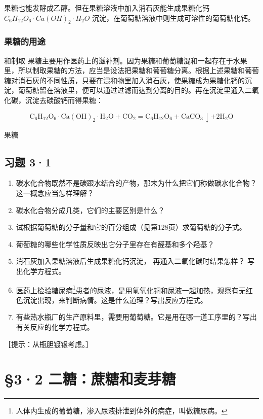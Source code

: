 果糖也能发酵成乙醇。但在果糖溶液中加入消石灰能生成果糖化钙
\(C_{6}H_{12}O_{6}\cdot Ca(OH)_{2}\cdot H_{2}O\)
沉淀，在葡萄糖溶液中则生成可溶性的葡萄糖化钙。

\subsubsection{果糖的用途}

和制取
果糖主要用作医药上的滋补剂。因为果糖和葡萄糖混和一起存在于水果里，所以制取果糖的方法，应当是设法把果糖和葡萄糖分离。根据上述果糖和葡萄糖对消石灰的不同性质，只要在混和物里加入消石灰，使果糖成为果糖化钙的沉淀，葡萄糖留在溶液里，便可以通过过滤而达到分离的目的。再在沉淀里通入二氧化碳，沉淀去碳酸钙而得果糖：

\[
\mathrm{C} _ {6} \mathrm{H} _ {12} \mathrm{O} _ {6} \cdot \mathrm{Ca} (\mathrm{OH}) _ {2} \cdot \mathrm{H} _ {2} \mathrm{O} + \mathrm{CO} _ {2} = \mathrm{C} _ {6} \mathrm{H} _ {12} \mathrm{O} _ {6} + \mathrm{CaCO} _ {3} \downarrow + 2 \mathrm{H} _ {2} \mathrm{O}
\]

果糖

\subsection{习题 3·1}

\begin{enumerate}
\item
  碳水化合物既然不是碳跟水结合的产物，那末为什么把它们称做碳水化合物？这一概念应当怎样理解？
\item
  碳水化合物分成几类，它们的主要区别是什么？
\item
  试根据葡萄糖的分子量和它的百分组成（见第128页）求葡萄糖的分子式。
\item
  葡萄糖的哪些化学性质反映出它分子里存在有醛基和多个羟基？
\item
  消石灰加入果糖溶液后生成果糖化钙沉淀， 再通入二氧化碳时结果怎样？
  写出化学方程式。
\item
  医药上检验糖尿病\footnote{人体内生成的葡萄糖，渗入尿液排泄到体外的病症，叫做糖尿病。}患者的尿液，是用氢氧化铜和尿液一起加热，观察有无红色沉淀出现，来判断病情。这是什么道理？写出反应方程式。
\item
  有些热水瓶厂的生产原料里，需要用葡萄糖。它是用在哪一道工序里的？写出有关反应的化学方程式。
\end{enumerate}

［提示：从瓶胆镀银考虑。］

\section{§3·2 二糖：蔗糖和麦芽糖}

